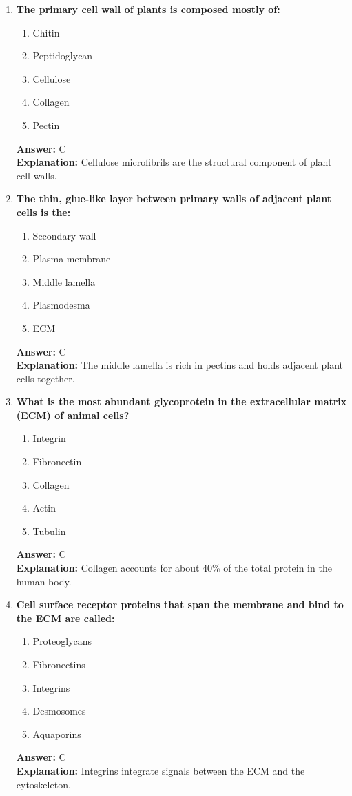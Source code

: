 \documentclass[11pt, a4paper]{article}
\begin{document}
\begin{enumerate}[leftmargin=*, label=\arabic*.]
\item \textbf{The primary cell wall of plants is composed mostly of:}
\begin{enumerate}[label=\Alph*.]
\item Chitin
\item Peptidoglycan
\item Cellulose
\item Collagen
\item Pectin
\end{enumerate}
\textbf{Answer:} C \\
\textbf{Explanation:} Cellulose microfibrils are the structural component of plant cell walls.

\item \textbf{The thin, glue-like layer between primary walls of adjacent plant cells is the:}
\begin{enumerate}[label=\Alph*.]
\item Secondary wall
\item Plasma membrane
\item Middle lamella
\item Plasmodesma
\item ECM
\end{enumerate}
\textbf{Answer:} C \\
\textbf{Explanation:} The middle lamella is rich in pectins and holds adjacent plant cells together.

\item \textbf{What is the most abundant glycoprotein in the extracellular matrix (ECM) of animal cells?}
\begin{enumerate}[label=\Alph*.]
\item Integrin
\item Fibronectin
\item Collagen
\item Actin
\item Tubulin
\end{enumerate}
\textbf{Answer:} C \\
\textbf{Explanation:} Collagen accounts for about 40\% of the total protein in the human body.

\item \textbf{Cell surface receptor proteins that span the membrane and bind to the ECM are called:}
\begin{enumerate}[label=\Alph*.]
\item Proteoglycans
\item Fibronectins
\item Integrins
\item Desmosomes
\item Aquaporins
\end{enumerate}
\textbf{Answer:} C \\
\textbf{Explanation:} Integrins integrate signals between the ECM and the cytoskeleton.


\end{enumerate}
\end{document}
